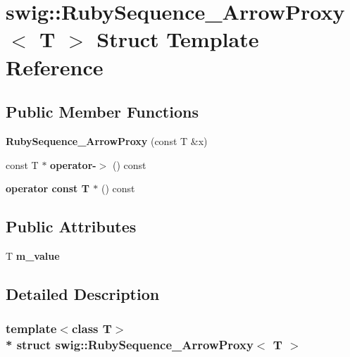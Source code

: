 \hypertarget{structswig_1_1RubySequence__ArrowProxy}{}\section{swig\+:\+:Ruby\+Sequence\+\_\+\+Arrow\+Proxy$<$ T $>$ Struct Template Reference}
\label{structswig_1_1RubySequence__ArrowProxy}
\subsection*{Public Member Functions}
\begin{DoxyCompactItemize}
\item 
{\bfseries Ruby\+Sequence\+\_\+\+Arrow\+Proxy} (const T \&x)\hypertarget{structswig_1_1RubySequence__ArrowProxy_a15ed5fe7250b796c8db0137a6a775120}{}\label{structswig_1_1RubySequence__ArrowProxy_a15ed5fe7250b796c8db0137a6a775120}

\item 
const T $\ast$ {\bfseries operator-\/$>$} () const \hypertarget{structswig_1_1RubySequence__ArrowProxy_a7846b803416eec5e9f8939a3e35af600}{}\label{structswig_1_1RubySequence__ArrowProxy_a7846b803416eec5e9f8939a3e35af600}

\item 
{\bfseries operator const T $\ast$} () const \hypertarget{structswig_1_1RubySequence__ArrowProxy_a24627bd08844e649ca1a0485846b8217}{}\label{structswig_1_1RubySequence__ArrowProxy_a24627bd08844e649ca1a0485846b8217}

\end{DoxyCompactItemize}
\subsection*{Public Attributes}
\begin{DoxyCompactItemize}
\item 
T {\bfseries m\+\_\+value}\hypertarget{structswig_1_1RubySequence__ArrowProxy_a65256148dca749ab1f1aecd465b245df}{}\label{structswig_1_1RubySequence__ArrowProxy_a65256148dca749ab1f1aecd465b245df}

\end{DoxyCompactItemize}


\subsection{Detailed Description}
\subsubsection*{template$<$class T$>$\\*
struct swig\+::\+Ruby\+Sequence\+\_\+\+Arrow\+Proxy$<$ T $>$}

